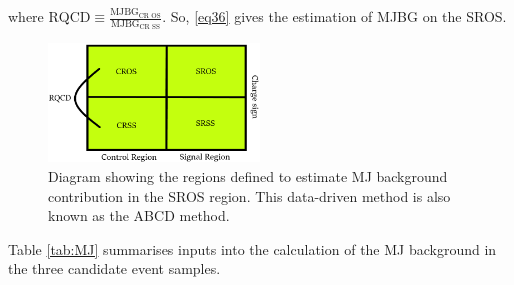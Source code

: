 where $\text{RQCD}\equiv\frac{\text{MJBG}_{\text{CR OS}}}{\text{MJBG}_{\text{CR SS}}}$. So, \eqref{eq36} gives the estimation of MJBG on the SROS.
\begin{figure}[htbp]
	\centering
	\includegraphics[width=0.5\textwidth]{figures/Fig7.png}
	\caption{Diagram showing the regions defined to estimate MJ background contribution in the SROS region. This data-driven method is also known as the ABCD method.}
	\label{Fig7}
\end{figure}
Table \ref{tab:MJ} summarises inputs into the calculation of the MJ background in the three candidate event samples. 
